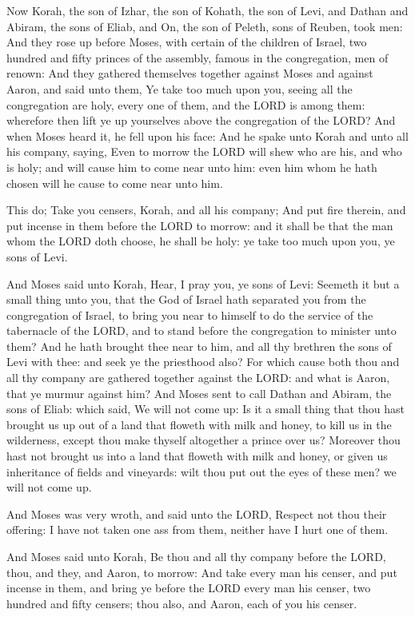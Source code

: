 \Chapter
\Verse Now Korah, the son of Izhar, the son of Kohath, the son of Levi,
and Dathan and Abiram, the sons of Eliab, and On, the son of Peleth,
sons of Reuben, took men: \Verse And they rose up before Moses, with
certain of the children of Israel, two hundred and fifty princes of
the assembly, famous in the congregation, men of renown: \Verse And they
gathered themselves together against Moses and against Aaron, and said
unto them, Ye take too much upon you, seeing all the congregation are
holy, every one of them, and the LORD is among them: wherefore then
lift ye up yourselves above the congregation of the LORD?  \Verse And
when Moses heard it, he fell upon his face: \Verse And he spake unto
Korah and unto all his company, saying, Even to morrow the LORD will
shew who are his, and who is holy; and will cause him to come near
unto him: even him whom he hath chosen will he cause to come near unto
him.

\Verse This do; Take you censers, Korah, and all his company; \Verse And
put fire therein, and put incense in them before the LORD to morrow:
and it shall be that the man whom the LORD doth choose, he shall be
holy: ye take too much upon you, ye sons of Levi.

\Verse And Moses said unto Korah, Hear, I pray you, ye sons of Levi:
\Verse Seemeth it but a small thing unto you, that the God of Israel
hath separated you from the congregation of Israel, to bring you near
to himself to do the service of the tabernacle of the LORD, and to
stand before the congregation to minister unto them?  \Verse And he
hath brought thee near to him, and all thy brethren the sons of Levi
with thee: and seek ye the priesthood also?  \Verse For which cause
both thou and all thy company are gathered together against the LORD:
and what is Aaron, that ye murmur against him?  \Verse And Moses sent
to call Dathan and Abiram, the sons of Eliab: which said, We will not
come up: \Verse Is it a small thing that thou hast brought us up out of
a land that floweth with milk and honey, to kill us in the wilderness,
except thou make thyself altogether a prince over us?  \Verse Moreover
thou hast not brought us into a land that floweth with milk and honey,
or given us inheritance of fields and vineyards: wilt thou put out the
eyes of these men? we will not come up.

\Verse And Moses was very wroth, and said unto the LORD, Respect not
thou their offering: I have not taken one ass from them, neither have
I hurt one of them.

\Verse And Moses said unto Korah, Be thou and all thy company before
the LORD, thou, and they, and Aaron, to morrow: \Verse And take every
man his censer, and put incense in them, and bring ye before the LORD
every man his censer, two hundred and fifty censers; thou also, and
Aaron, each of you his censer.


